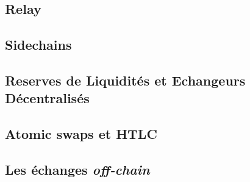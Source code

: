 % 

\subsection[Relay]{Relay}


\subsection[Sidechains]{Sidechains}


\subsection[Réserves de Liquidités et Echangeurs Décentralisés]{Reserves de Liquidités et Echangeurs Décentralisés}


\subsection[Atomic swaps et HTLC]{Atomic swaps et HTLC}


\subsection[Échanges "off-chain"]{Les échanges \textit{off-chain}}
